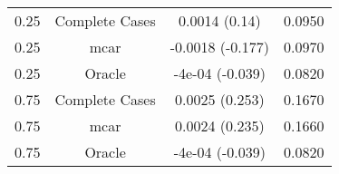 \begin{table}[ht]
\centering
\begin{tabular}{cccc}
  \hline
  \hline
0.25 & Complete Cases & 0.0014 (0.14) & 0.0950 \\ 
  0.25 & mcar & -0.0018 (-0.177) & 0.0970 \\ 
  0.25 & Oracle & -4e-04 (-0.039) & 0.0820 \\ 
  0.75 & Complete Cases & 0.0025 (0.253) & 0.1670 \\ 
  0.75 & mcar & 0.0024 (0.235) & 0.1660 \\ 
  0.75 & Oracle & -4e-04 (-0.039) & 0.0820 \\ 
   \hline
\end{tabular}
\end{table}
